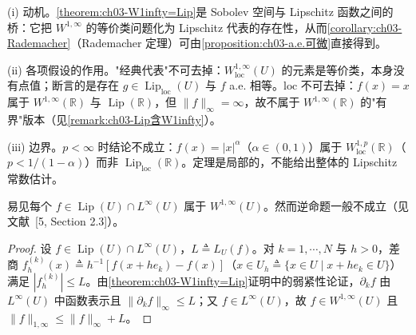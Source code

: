 \documentclass[../../main.tex]{subfiles}%
\begin{document}
\begin{remark}\label{remark:ch03-W1infty=Lip动机}
(i) 动机。\cref{theorem:ch03-W1infty=Lip}是 Sobolev 空间与 Lipschitz 函数之间的桥：它把 $W^{1,\infty}$ 的等价类问题化为 Lipschitz 代表的存在性，从而\cref{corollary:ch03-Rademacher}（Rademacher 定理）可由\cref{proposition:ch03-a.e.可微}直接得到。

(ii) 各项假设的作用。"经典代表"不可去掉：$W^{1,\infty}_{\mathrm{loc}}(U)$ 的元素是等价类，本身没有点值；断言的是存在 $g\in\operatorname{Lip}_{\mathrm{loc}}(U)$ 与 $f$ a.e. 相等。$\mathrm{loc}$ 不可去掉：$f(x)=x$ 属于 $W^{1,\infty}(\mathbb{R})$ 与 $\operatorname{Lip}(\mathbb{R})$，但 $\|f\|_\infty=\infty$，故不属于 $W^{1,\infty}(\mathbb{R})$ 的"有界"版本（见\cref{remark:ch03-Lip含W1infty}）。

(iii) 边界。$p<\infty$ 时结论不成立：$f(x)=|x|^{\alpha}$（$\alpha\in(0,1)$）属于 $W^{1,p}_{\mathrm{loc}}(\mathbb{R})$（$p<1/(1-\alpha)$）而非 $\operatorname{Lip}_{\mathrm{loc}}(\mathbb{R})$。定理是局部的，不能给出整体的 Lipschitz 常数估计。
\end{remark}

\begin{remark}\label{remark:ch03-Lip含W1infty}
易见每个 $f\in\operatorname{Lip}(U)\cap L^\infty(U)$ 属于 $W^{1,\infty}(U)$。然而逆命题一般不成立（见文献~[5, Section 2.3]）。
\end{remark}

\begin{proof}
设 $f\in\operatorname{Lip}(U)\cap L^\infty(U)$，$L\triangleq L_U(f)$。对 $k=1,\cdots ,N$ 与 $h>0$，差商 $f_h^{(k)}(x)\triangleq h^{-1}[f(x+he_k)-f(x)]$（$x\in U_h\triangleq\{x\in U\mid x+he_k\in U\}$）满足 $|f_h^{(k)}|\leqslant L$。由\cref{theorem:ch03-W1infty=Lip}证明中的弱紧性论证，$\partial_kf$ 由 $L^\infty(U)$ 中函数表示且 $\|\partial_kf\|_\infty\leqslant L$；又 $f\in L^\infty(U)$，故 $f\in W^{1,\infty}(U)$ 且 $\|f\|_{1,\infty}\leqslant\|f\|_\infty+L$。
\end{proof}
\end{document}
